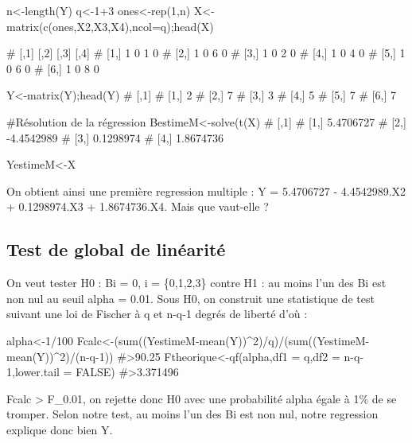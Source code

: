 \begin{Schunk}
\begin{Sinput}
n<-length(Y)
q<-1+3
ones<-rep(1,n)
X<-matrix(c(ones,X2,X3,X4),ncol=q);head(X)
\end{Sinput}
\end{Schunk}

\begin{Schunk}
\begin{Sinput}
#     [,1] [,2] [,3] [,4]
# [1,]    1    0    1    0
# [2,]    1    0    6    0
# [3,]    1    0    2    0
# [4,]    1    0    4    0
# [5,]    1    0    6    0
# [6,]    1    0    8    0

Y<-matrix(Y);head(Y)
#     [,1]
# [1,]    2
# [2,]    7
# [3,]    3
# [4,]    5
# [5,]    7
# [6,]    7

#Résolution de la régression
BestimeM<-solve(t(X)%
#            [,1]
# [1,]  5.4706727
# [2,] -4.4542989
# [3,]  0.1298974
# [4,]  1.8674736

YestimeM<-X%
\end{Sinput}
\end{Schunk}

On obtient ainsi une première regression multiple : Y = 5.4706727 -
4.4542989.X2 + 0.1298974.X3 + 1.8674736.X4. Mais que vaut-elle ?

\hypertarget{test-de-global-de-linuxe9arituxe9}{%
\subsection{Test de global de
linéarité}\label{test-de-global-de-linuxe9arituxe9}}

On veut tester H0 : Bi = 0, i = \{0,1,2,3\} contre H1 : au moins l'un
des Bi est non nul au seuil alpha = 0.01. Sous H0, on construit une
statistique de test suivant une loi de Fischer à q et n-q-1 degrés de
liberté d'où :

\begin{Schunk}
\begin{Sinput}
alpha<-1/100
Fcalc<-(sum((YestimeM-mean(Y))^2)/q)/(sum((YestimeM-mean(Y))^2)/(n-q-1))
#>90.25
Ftheorique<-qf(alpha,df1 = q,df2 = n-q-1,lower.tail = FALSE)
#>3.371496
\end{Sinput}
\end{Schunk}

\textbar Fcalc\textbar{} \textgreater{} F\_0.01, on rejette donc H0 avec
une probabilité alpha égale à 1\% de se tromper. Selon notre test, au
moins l'un des Bi est non nul, notre regression explique donc bien Y.

